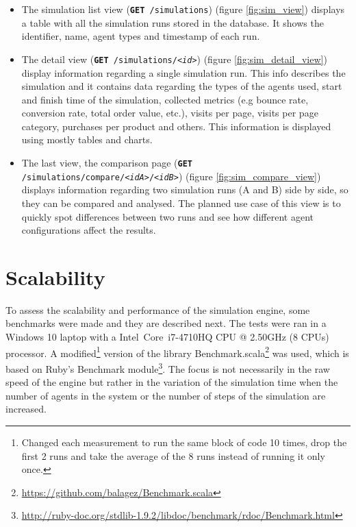 \begin{itemize}
    \item The simulation list view (\texttt{\textbf{GET} /simulations}) (figure 
    \ref{fig:sim_view}) displays a table 
    with all the simulation runs stored in the database. It shows the 
    identifier, name, agent types and timestamp of each run.
    \item The detail view (\texttt{\textbf{GET} /simulations/\textit{<id>}}) 
    (figure \ref{fig:sim_detail_view})
    display information regarding a single simulation run. This info describes 
    the simulation and it contains data regarding the types of the agents used, 
    start and finish time of the simulation, collected metrics (e.g bounce 
    rate, conversion rate, total order value, etc.), visits per page, visits 
    per page category, purchases per product and others. This information is 
    displayed using mostly tables and charts.
    \item The last view, the comparison page (\texttt{\textbf{GET} 
    /simulations/compare/\textit{<idA>}/\textit{<idB>}}) (figure 
    \ref{fig:sim_compare_view}) displays information 
    regarding two simulation runs (A and B) side by side, so they can be 
    compared and analysed. The planned use case of this view is to quickly spot 
    differences between two runs and see how different agent configurations 
    affect the results.
\end{itemize}


\section{Scalability}\label{sec:scalability}

To assess the scalability and performance of the simulation engine, some 
benchmarks were made and they are described next. The tests were ran in a 
Windows 10 laptop with a Intel\textregistered~Core\texttrademark~i7-4710HQ CPU 
@ 2.50GHz (8 CPUs) processor. A modified\footnote{Changed each measurement to 
run the same block of code 10 times, drop the first 2 runs and take the average 
of the 8 runs instead of running it only once.} version of the library 
Benchmark.scala\footnote{\url{https://github.com/balagez/Benchmark.scala}} was 
used, which is based on Ruby's Benchmark 
module\footnote{\url{http://ruby-doc.org/stdlib-1.9.2/libdoc/benchmark/rdoc/Benchmark.html}}.
 The focus is not necessarily in the raw speed of the engine but rather in the 
variation of the simulation time when the number of agents in the system or the 
number of steps of the simulation are increased.

